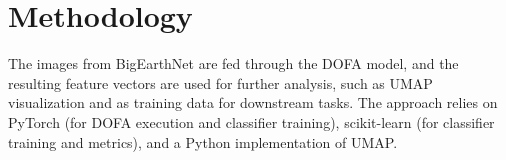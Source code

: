 \section{Methodology}
\label{sec:methodology}

The images from BigEarthNet are fed through the DOFA model, and the resulting feature vectors are used for further analysis, such as UMAP visualization and as training data for downstream tasks. The approach relies on PyTorch (for DOFA execution and classifier training), scikit-learn (for classifier training and metrics), and a Python implementation of UMAP.